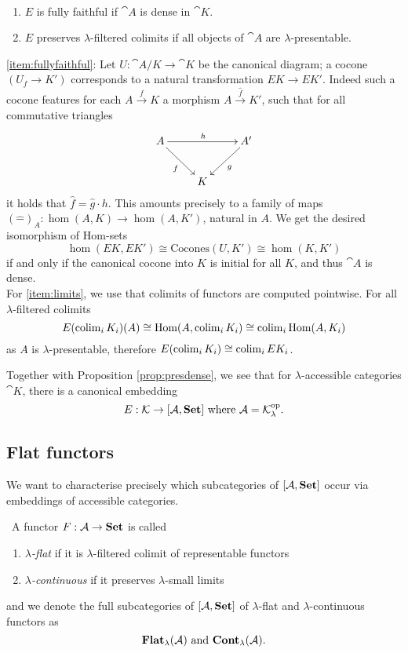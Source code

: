 \begin{Proposition}\
\label{prop:canonicalproperties}
\begin{enumerate}
\item $E$ is fully faithful if $\cat A$ is dense in $\cat K$. \label{item:fullyfaithful}
\item $E$ preserves $\lambda$-filtered colimits if all objects of $\cat A$ are $\lambda$-presentable. \label{item:limits}
\end{enumerate}
\end{Proposition}

\begin{Proof}
\ref{item:fullyfaithful}: Let $U : \cat A/K \to \cat K$ be the canonical diagram; a cocone $(U_f \to K')$ corresponds to a natural transformation $EK \to EK'$. Indeed such a cocone features for each $A \xrightarrow{f} K$ a morphism $A \xrightarrow{\hat f} K'$, such that for all commutative triangles
\[
\xymatrix{
A \ar[rr]^{h} \ar[rd]_{f} & & A' \ar[ld]^{g} \\
& K
}\]
it holds that $\hat f = \hat g \cdot h$. This amounts precisely to a family of maps $(\widehat{-})_A: \hom(A,K) \to \hom(A,K')$, natural in $A$. We get the desired isomorphism of Hom-sets
\[ \hom(EK,EK') \cong \textrm{Cocones}(U, K') \cong \hom(K,K') \] 
if and only if the canonical cocone into $K$ is initial for all $K$, and thus $\cat A$ is dense. \\

For \ref{item:limits}, we use that colimits of functors are computed pointwise. For all $\lambda$-filtered colimits
\[ E(\operatorname{colim}_i K_i)(A) \cong \textrm{Hom}(A,\operatorname{colim}_i K_i) \cong \operatorname{colim}_i \textrm{Hom}(A,K_i) \]
as $A$ is $\lambda$-presentable, therefore $E(\operatorname{colim}_i K_i) \cong \operatorname{colim}_i EK_i$.
\end{Proof}

Together with Proposition \ref{prop:presdense}, we see that for $\lambda$-accessible categories $\cat K$, there is a canonical embedding
\[ E : \mathcal{K} \to [\mathcal{A},\mathbf{Set}] \text{ where } \mathcal{A} = \mathcal{K}^{\textrm{op}}_\lambda. \]

\subsection{Flat functors}
We want to characterise precisely which subcategories of $[\mathcal{A},\mathbf{Set}]$ occur via embeddings of accessible categories.

\begin{Definition}\
A functor $F : \mathcal{A} \to \mathbf{Set}$ is called
\begin{enumerate}
\item \emph{$\lambda$-flat} if it is $\lambda$-filtered colimit of representable functors
\item \emph{$\lambda$-continuous} if it preserves $\lambda$-small limits
\end{enumerate}
and we denote the full subcategories of $[\mathcal{A},\mathbf{Set}]$ of $\lambda$-flat and $\lambda$-continuous functors as 
\[ \mathbf{Flat}_\lambda(\mathcal{A})  \text{ and } \mathbf{Cont}_\lambda(\mathcal{A}). \]
\end{Definition}

